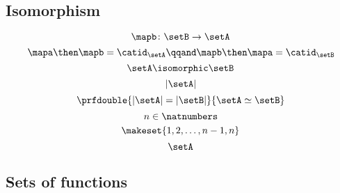 \begin{forslides}
    \subsection{Isomorphism}

    \begin{equation}
        \label{eq:slides_session2_148}
        \mapb \colon \setB \to \setA
    \end{equation}
    \begin{equation}
        \label{eq:slides_session2_149}
        \mapa \then \mapb = \catid_\setA
        \qqand
        \mapb \then \mapa = \catid_\setB
    \end{equation}
    \begin{equation}
        \label{eq:slides_session2_150}
        \setA \isomorphic \setB
    \end{equation}
    \begin{equation}
        \label{eq:slides_session2_151}
        \vert \setA \vert
    \end{equation}
    \begin{equation}
        \label{eq:slides_session2_152}
        \prfdouble{ \vert \setA \vert = \vert \setB \vert }{ \setA \simeq \setB }
    \end{equation}
    \begin{equation}
        \label{eq:slides_session2_153}
        n \in \natnumbers
    \end{equation}
    \begin{equation}
        \label{eq:slides_session2_154}
        \makeset{1,2, \dots, n-1, n}
    \end{equation}
    \begin{equation}
        \label{eq:slides_session2_155}
        \setA
    \end{equation}

    \subsection{Sets of functions}


\end{forslides}
